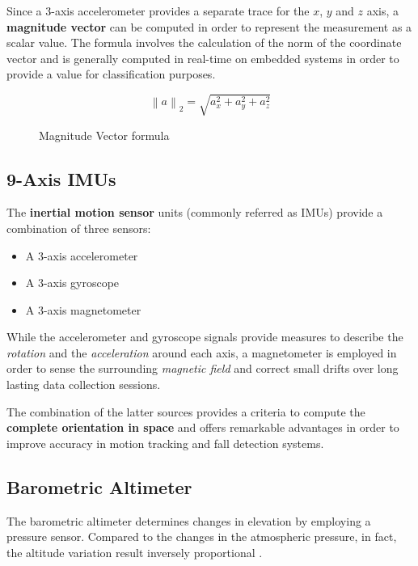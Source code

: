 Since a 3-axis accelerometer provides a separate trace for the $x$, $y$ and $z$ axis, a \textbf{magnitude vector} can be computed in order to represent the measurement as a scalar value. The formula involves the calculation of the norm of the coordinate vector and is generally computed in real-time on embedded systems in order to provide a value for classification purposes.

\newcommand\norm[1]{\left\lVert#1\right\rVert}

\begin{figure}[h]
    \begin{equation}
    \norm{a}_2 = \sqrt{a_{x}^2 + a_{y}^2 + a_{z}^2}
    \end{equation}
    \caption{Magnitude Vector formula}
    \label{fig:magnitude}
\end{figure}

\subsection{9-Axis IMUs}\label{subsec:imus}

The \textbf{inertial motion sensor} units (commonly referred as IMUs) provide a combination of three sensors:

\begin{itemize}
    \item A 3-axis accelerometer
    \item A 3-axis gyroscope 
    \item A 3-axis magnetometer 
\end{itemize}

While the accelerometer and gyroscope signals provide measures to describe the \emph{rotation} and the \emph{acceleration} around each axis, a magnetometer is employed in order to sense the surrounding \emph{magnetic field} and correct small drifts over long lasting data collection sessions.

The combination of the latter sources provides a criteria to compute the \textbf{complete orientation in space} and offers remarkable advantages in order to improve accuracy in motion tracking and fall detection systems.

\subsection{Barometric Altimeter}\label{subsec:altimeter}

The barometric altimeter determines changes in elevation by employing a pressure sensor. Compared to the changes in the atmospheric pressure, in fact, the altitude variation result inversely proportional \cite{mems-altimeter}.

